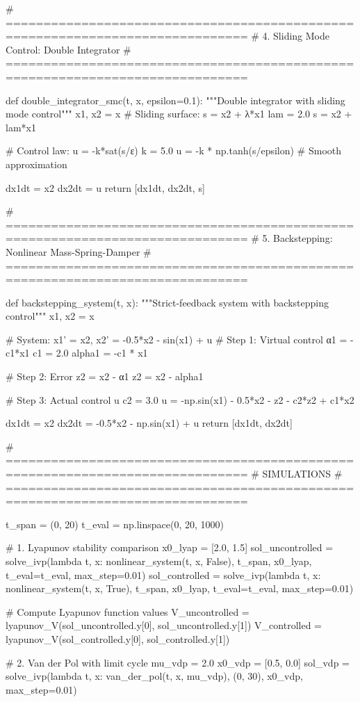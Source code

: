 \documentclass[a4paper, 11pt]{article}
\begin{document}
\begin{pycode}
# ==============================================================================
# 4. Sliding Mode Control: Double Integrator
# ==============================================================================

def double_integrator_smc(t, x, epsilon=0.1):
    """Double integrator with sliding mode control"""
    x1, x2 = x
    # Sliding surface: s = x2 + λ*x1
    lam = 2.0
    s = x2 + lam*x1

    # Control law: u = -k*sat(s/ε)
    k = 5.0
    u = -k * np.tanh(s/epsilon)  # Smooth approximation

    dx1dt = x2
    dx2dt = u
    return [dx1dt, dx2dt, s]

# ==============================================================================
# 5. Backstepping: Nonlinear Mass-Spring-Damper
# ==============================================================================

def backstepping_system(t, x):
    """Strict-feedback system with backstepping control"""
    x1, x2 = x

    # System: x1' = x2, x2' = -0.5*x2 - sin(x1) + u
    # Step 1: Virtual control α1 = -c1*x1
    c1 = 2.0
    alpha1 = -c1 * x1

    # Step 2: Error z2 = x2 - α1
    z2 = x2 - alpha1

    # Step 3: Actual control u
    c2 = 3.0
    u = -np.sin(x1) - 0.5*x2 - z2 - c2*z2 + c1*x2

    dx1dt = x2
    dx2dt = -0.5*x2 - np.sin(x1) + u
    return [dx1dt, dx2dt]

# ==============================================================================
# SIMULATIONS
# ==============================================================================

t_span = (0, 20)
t_eval = np.linspace(0, 20, 1000)

# 1. Lyapunov stability comparison
x0_lyap = [2.0, 1.5]
sol_uncontrolled = solve_ivp(lambda t, x: nonlinear_system(t, x, False),
                              t_span, x0_lyap, t_eval=t_eval, max_step=0.01)
sol_controlled = solve_ivp(lambda t, x: nonlinear_system(t, x, True),
                           t_span, x0_lyap, t_eval=t_eval, max_step=0.01)

# Compute Lyapunov function values
V_uncontrolled = lyapunov_V(sol_uncontrolled.y[0], sol_uncontrolled.y[1])
V_controlled = lyapunov_V(sol_controlled.y[0], sol_controlled.y[1])

# 2. Van der Pol with limit cycle
mu_vdp = 2.0
x0_vdp = [0.5, 0.0]
sol_vdp = solve_ivp(lambda t, x: van_der_pol(t, x, mu_vdp),
                    (0, 30), x0_vdp, max_step=0.01)


\end{pycode}
\end{document}
